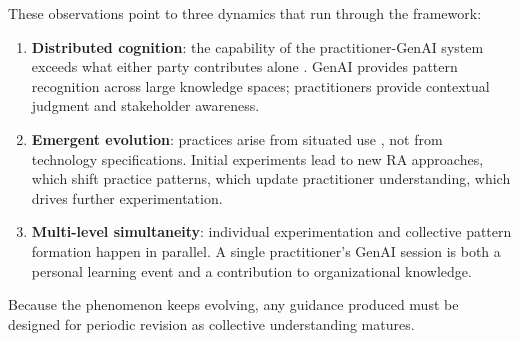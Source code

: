 These observations point to three dynamics that run through the framework:

\begin{enumerate}
      \item \textbf{Distributed cognition}: the capability of the practitioner-GenAI
            system exceeds what either party contributes alone
            \parencite{hutchins_cognition_1995}. GenAI provides pattern recognition
            across large knowledge spaces; practitioners provide contextual judgment
            and stakeholder awareness.
      \item \textbf{Emergent evolution}: practices arise from situated use
            \parencite{orlikowski_using_2000}, not from technology specifications.
            Initial experiments lead to new RA approaches, which shift practice
            patterns, which update practitioner understanding, which drives further
            experimentation.
      \item \textbf{Multi-level simultaneity}: individual experimentation and
            collective pattern formation happen in parallel. A single practitioner's
            GenAI session is both a personal learning event and a contribution to
            organizational knowledge.
\end{enumerate}

Because the phenomenon keeps evolving, any guidance produced must be designed
for periodic revision as collective understanding matures.
